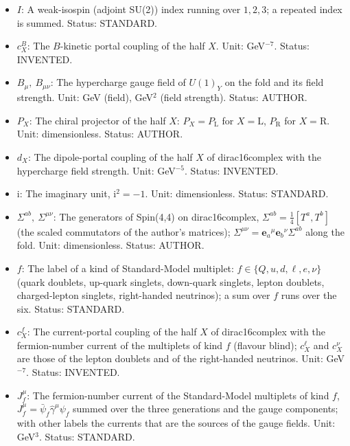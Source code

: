 \documentclass[
  10pt,
]{article}
\begin{document}
\begin{itemize}
  fold, \(W^1_\mu, W^2_\mu, W^3_\mu\), and its field strength. Unit: GeV
  (field), GeV\(^2\) (field strength). Status: AUTHOR.
\item
  \(I\): A weak-isospin (adjoint SU(2)) index running over \(1, 2, 3\);
  a repeated index is summed. Status: STANDARD.
\item
  \(c^{B}_X\): The \(B\)-kinetic portal coupling of the half \(X\).
  Unit: GeV\(^{-7}\). Status: INVENTED.
\item
  \(B_\mu,\ B_{\mu\nu}\): The hypercharge gauge field of \(U(1)_Y\) on
  the fold and its field strength. Unit: GeV (field), GeV\(^2\) (field
  strength). Status: AUTHOR.
\item
  \(P_X\): The chiral projector of the half \(X\):
  \(P_X = P_{\mathrm{L}}\) for \(X = \mathrm{L}\), \(P_{\mathrm{R}}\)
  for \(X = \mathrm{R}\). Unit: dimensionless. Status: AUTHOR.
\item
  \(d_X\): The dipole-portal coupling of the half \(X\) of
  dirac16complex with the hypercharge field strength. Unit:
  GeV\(^{-5}\). Status: INVENTED.
\item
  \(\mathrm{i}\): The imaginary unit, \(\mathrm{i}^2 = -1\). Unit:
  dimensionless. Status: STANDARD.
\item
  \(\Sigma^{ab},\ \Sigma^{\mu\nu}\): The generators of Spin(4,4) on
  dirac16complex, \(\Sigma^{ab} = \frac14[T^a, T^b]\) (the scaled
  commutators of the author's matrices);
  \(\Sigma^{\mu\nu} = \mathbf{e}_a{}^\mu\mathbf{e}_b{}^\nu\Sigma^{ab}\)
  along the fold. Unit: dimensionless. Status: AUTHOR.
\item
  \(f\): The label of a kind of Standard-Model multiplet:
  \(f \in \{Q, u, d, \ell, e, \nu\}\) (quark doublets, up-quark
  singlets, down-quark singlets, lepton doublets, charged-lepton
  singlets, right-handed neutrinos); a sum over \(f\) runs over the six.
  Status: STANDARD.
\item
  \(c^{f}_X\): The current-portal coupling of the half \(X\) of
  dirac16complex with the fermion-number current of the multiplets of
  kind \(f\) (flavour blind); \(c^{\ell}_X\) and \(c^{\nu}_X\) are those
  of the lepton doublets and of the right-handed neutrinos. Unit:
  GeV\(^{-7}\). Status: INVENTED.
\item
  \(J_f^\mu\): The fermion-number current of the Standard-Model
  multiplets of kind \(f\), \(J_f^\mu = \bar\psi_f\hat\gamma^\mu\psi_f\)
  summed over the three generations and the gauge components; with other
  labels the currents that are the sources of the gauge fields. Unit:
  GeV\(^3\). Status: STANDARD.

\end{itemize}
\end{document}
